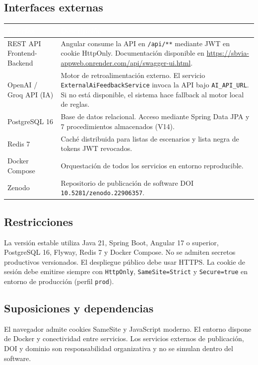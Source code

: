 \documentclass[11pt,a4paper]{article}
\begin{document}
\subsection{Interfaces externas}
\begin{table}[h]
    \centering
    \renewcommand{\arraystretch}{1.3}
    \begin{tabularx}{\textwidth}{@{}|l|X|@{}}
        \hline
        \rowcolor{uteqblue}
        \textcolor{white}{\textbf{Interfaz}} & \textcolor{white}{\textbf{Descripción}} \\ \hline
        REST API Frontend-Backend & Angular consume la API en \texttt{/api/**} mediante JWT en cookie HttpOnly. Documentación disponible en \url{https://sbvia-appweb.onrender.com/api/swagger-ui.html}. \\ \hline
        OpenAI / Groq API (IA) & Motor de retroalimentación externo. El servicio \texttt{ExternalAiFeedbackService} invoca la API bajo \texttt{AI\_API\_URL}. Si no está disponible, el sistema hace fallback al motor local de reglas. \\ \hline
        PostgreSQL 16 & Base de datos relacional. Acceso mediante Spring Data JPA y 7 procedimientos almacenados (V14). \\ \hline
        Redis 7 & Caché distribuida para listas de escenarios y lista negra de tokens JWT revocados. \\ \hline
        Docker Compose & Orquestación de todos los servicios en entorno reproducible. \\ \hline
        Zenodo & Repositorio de publicación de software DOI \texttt{10.5281/zenodo.22906357}. \\ \hline
    \end{tabularx}
\end{table}

\subsection{Restricciones}
La versión estable utiliza Java 21, Spring Boot, Angular 17 o superior, PostgreSQL 16, Flyway, Redis 7 y Docker Compose. No se admiten secretos productivos versionados. El despliegue público debe usar HTTPS. La cookie de sesión debe emitirse siempre con \texttt{HttpOnly}, \texttt{SameSite=Strict} y \texttt{Secure=true} en entorno de producción (perfil \texttt{prod}).

\subsection{Suposiciones y dependencias}
El navegador admite cookies SameSite y JavaScript moderno. El entorno dispone de Docker y conectividad entre servicios. Los servicios externos de publicación, DOI y dominio son responsabilidad organizativa y no se simulan dentro del software.
\end{document}
